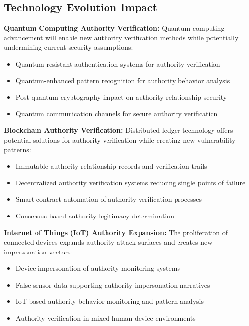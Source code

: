 \documentclass[11pt,a4paper]{article}
\begin{document}
\subsection{Technology Evolution Impact}

\textbf{Quantum Computing Authority Verification:}
Quantum computing advancement will enable new authority verification methods while potentially undermining current security assumptions:

\begin{itemize}
\item Quantum-resistant authentication systems for authority verification
\item Quantum-enhanced pattern recognition for authority behavior analysis
\item Post-quantum cryptography impact on authority relationship security
\item Quantum communication channels for secure authority verification
\end{itemize}

\textbf{Blockchain Authority Verification:}
Distributed ledger technology offers potential solutions for authority verification while creating new vulnerability patterns:

\begin{itemize}
\item Immutable authority relationship records and verification trails
\item Decentralized authority verification systems reducing single points of failure
\item Smart contract automation of authority verification processes
\item Consensus-based authority legitimacy determination
\end{itemize}

\textbf{Internet of Things (IoT) Authority Expansion:}
The proliferation of connected devices expands authority attack surfaces and creates new impersonation vectors:

\begin{itemize}
\item Device impersonation of authority monitoring systems
\item False sensor data supporting authority impersonation narratives
\item IoT-based authority behavior monitoring and pattern analysis
\item Authority verification in mixed human-device environments
\end{itemize}
\end{document}
